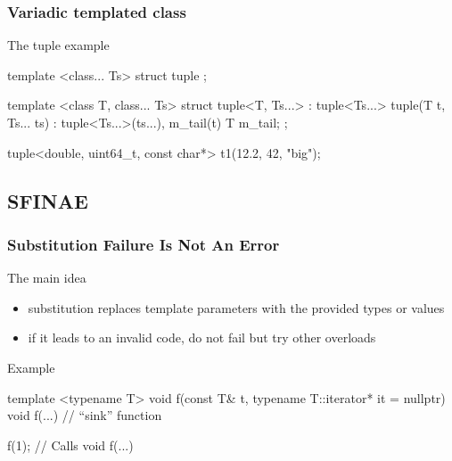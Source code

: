 \begin{frame}[fragile]
  \frametitle{Variadic templated class}
  \begin{block}{The tuple example}
    \begin{cppcode*}{}
      template <class... Ts> struct tuple {};
      
      template <class T, class... Ts>
      struct tuple<T, Ts...> : tuple<Ts...> {
        tuple(T t, Ts... ts) :
          tuple<Ts...>(ts...), m_tail(t) {}
        T m_tail;
      };
      
      tuple<double, uint64_t, const char*>
        t1(12.2, 42, "big");
    \end{cppcode*}
  \end{block}
\end{frame}


\subsection[snifae]{SFINAE}

\begin{frame}[fragile]
  \frametitle{Substitution Failure Is Not An Error}
  \begin{block}{The main idea}
    \begin{itemize}
    \item substitution replaces template parameters with the provided types or values
    \item if it leads to an invalid code, do not fail but try other overloads
    \end{itemize}
  \end{block}
  \begin{exampleblock}{Example}
    \begin{cppcode*}{}
      template <typename T>
      void f(const T& t,
             typename T::iterator* it = nullptr) { }
      void f(...) { }   // ``sink'' function

      f(1); // Calls void f(...)
    \end{cppcode*}
  \end{exampleblock}
\end{frame}

